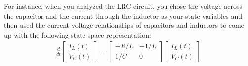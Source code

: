 For instance, when you analyzed the LRC circuit, you chose the voltage across the capacitor and the current through the inductor as your state variables and then used the current-voltage relationships of capacitors and inductors to come up with the following state-space representation:
\begin{align*}
    \frac{d}{dt} \begin{bmatrix} 
        I_L(t) \\ V_C(t)
    \end{bmatrix} = \begin{bmatrix}
        -R/L & -1/L \\
        1/C & 0
    \end{bmatrix} \begin{bmatrix} 
        I_L(t) \\ V_C(t)
    \end{bmatrix}
    \end{align*}

